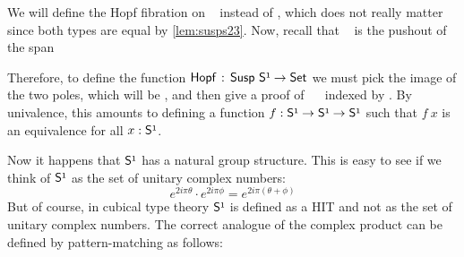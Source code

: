 We will define the Hopf fibration on ~ instead of 
, which does not really matter since both types are equal by
\cref{lem:susps23}.
Now, recall that ~ is the pushout of the span
\begin{center}
\end{center}

Therefore, to define the function 
\( \func{Hopf}\,:\,\func{Susp}~\func{S¹} \to \func{Set} \) we must 
pick the image of the two poles, which will be , and then
give a proof of ~~ indexed by .
% 
By univalence, this amounts to defining a function 
\( f : \func{S¹} \to \func{S¹} \to \func{S¹} \) such that \( f~x \)
is an equivalence for all \( x : \func{S¹} \).

Now it happens that \( \func{S¹} \) has a natural group structure. 
This is easy to see if we think of \( \func{S¹} \) as the set of unitary 
complex numbers:
\[
e^{2i\pi \theta} \cdot e^{2i\pi \phi} = e^{2i\pi (\theta + \phi)}
\]
But of course, in cubical type theory \( \func{S¹} \) is defined as a HIT and 
not as the set of unitary complex numbers. 
The correct analogue of the complex product can be defined by pattern-matching 
as follows:
%

